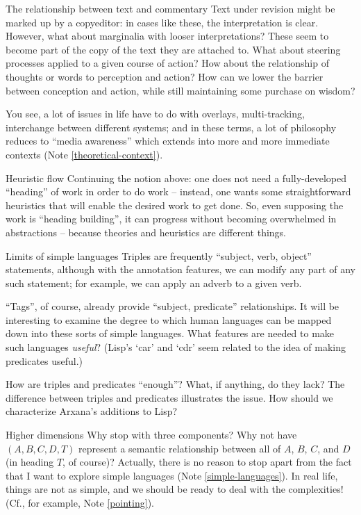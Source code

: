 \begin{notate}{The relationship between text and commentary}
Text under revision might be marked up by a copyeditor: in
cases like these, the interpretation is clear.  However,
what about marginalia with looser interpretations?  These
seem to become part of the copy of the text they are
attached to.  What about steering processes applied to a
given course of action?  How about the relationship of
thoughts or words to perception and action?  How can we
lower the barrier between conception and action, while
still maintaining some purchase on wisdom?

You see, a lot of issues in life have to do with overlays,
multi-tracking, interchange between different systems; and
in these terms, a lot of philosophy reduces to ``media
awareness'' which extends into more and more immediate
contexts (Note \ref{theoretical-context}).
\end{notate}

\begin{notate}{Heuristic flow}
Continuing the notion above: one does not need a
fully-developed ``heading'' of work in order to do work --
instead, one wants some straightforward heuristics that
will enable the desired work to get done.  So, even
supposing the work is ``heading building'', it can progress
without becoming overwhelmed in abstractions -- because
theories and heuristics are different things.
\end{notate}

\begin{notate}{Limits of simple languages} \label{simple-languages}
Triples are frequently ``subject, verb, object''
statements, although with the annotation features, we can
modify any part of any such statement; for example, we
can apply an adverb to a given verb.

``Tags'', of course, already provide ``subject,
predicate'' relationships.  It will be interesting to
examine the degree to which human languages can be mapped
down into these sorts of simple languages.  What features
are needed to make such languages \emph{useful}?  (Lisp's
`car' and `cdr' seem related to the idea of making
predicates useful.)

How are triples and predicates ``enough''?  What, if
anything, do they lack?  The difference between triples
and predicates illustrates the issue.  How should we
characterize Arxana's additions to Lisp?
\end{notate}

\begin{notate}{Higher dimensions}
Why stop with three components?  Why not have $(A, B, C,
D, T)$ represent a semantic relationship between all of
$A$, $B$, $C$, and $D$ (in heading $T$, of course)?
Actually, there is no reason to stop apart from the fact
that I want to explore simple languages (Note
\ref{simple-languages}).  In real life, things are not as
simple, and we should be ready to deal with the
complexities! (Cf., for example, Note \ref{pointing}).
\end{notate}

